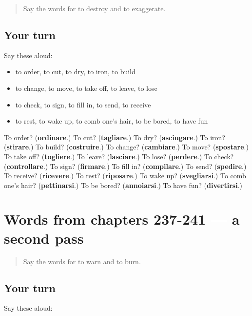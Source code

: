 \begin{quote}
Say the words for to destroy and to exaggerate.
\end{quote}

\subsection*{Your turn}
Say these aloud:

\begin{itemize}
\raggedright
  \item to order, to cut, to dry, to iron, to build
  \item to change, to move, to take off, to leave, to lose
  \item to check, to sign, to fill in, to send, to receive
  \item to rest, to wake up, to comb one's hair, to be bored, to have fun
\end{itemize}

\begin{tcolorbox}[breakable,colback=teal!4,colframe=teal!35!black,title={Before you move on}]
To order? (\textbf{ordinare}.) To cut? (\textbf{tagliare}.) To dry? (\textbf{asciugare}.) To iron? (\textbf{stirare}.) To build? (\textbf{costruire}.) To change? (\textbf{cambiare}.) To move? (\textbf{spostare}.) To take off? (\textbf{togliere}.) To leave? (\textbf{lasciare}.) To lose? (\textbf{perdere}.) To check? (\textbf{controllare}.) To sign? (\textbf{firmare}.) To fill in? (\textbf{compilare}.) To send? (\textbf{spedire}.) To receive? (\textbf{ricevere}.) To rest? (\textbf{riposare}.) To wake up? (\textbf{svegliarsi}.) To comb one's hair? (\textbf{pettinarsi}.) To be bored? (\textbf{annoiarsi}.) To have fun? (\textbf{divertirsi}.)
\end{tcolorbox}
\section[(dialogue)]{Words from chapters 237-241 — a second pass}

\label{lesson:IT-R241-second-pass-words-from-chapters-237-241}



\begin{quote}
Say the words for to warn and to burn.
\end{quote}

\subsection*{Your turn}
Say these aloud:

